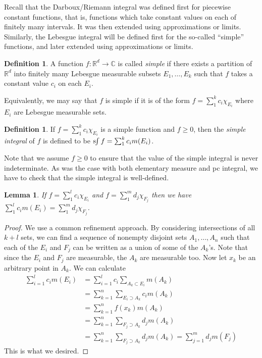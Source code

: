 \documentclass[11pt,oneside]{amsbook}
\newcommand{\RR}{{\mathbb R}}
\newcommand{\CC}{{\mathbb C}}
\newcommand{\sint}{\text{s}\kern-3pt\int}
\theoremstyle{definition}
\theoremstyle{plain}
\newtheorem{lem}[thm]{Lemma}
\theoremstyle{definition}
\newtheorem{defn}[thm]{Definition}
\theoremstyle{remark}
\numberwithin{equation}{section}
\numberwithin{figure}{section}
\begin{document}
Recall that the Darboux/Riemann integral was defined first for piecewise constant functions, that is, functions which take constant values on each of finitely many intervals. It was then extended using approximations or limits. Similarly, the Lebesgue integral will be defined first for the so-called ``simple'' functions, and later extended using approximations or limits.

\begin{defn}
  A function $f\colon\RR^d\to\CC$ is called \emph{simple} if there exists a partition of $\RR^d$ into finitely many Lebesgue measurable subsets $E_1,\ldots,E_k$ such that $f$ takes a constant value $c_i$ on each $E_i$.
\end{defn}

Equivalently, we may say that $f$ is simple if it is of the form $f=\sum_1^kc_i\chi_{E_i}$ where $E_i$ are Lebesgue measurable sets.

\begin{defn}
  If $f=\sum_1^kc_i\chi_{E_i}$ is a simple function and $f\geq0$, then the \emph{simple integral} of $f$ is defined to be $\sint f=\sum_1^kc_im(E_i)$.
\end{defn}

Note that we assume $f\geq0$ to ensure that the value of the simple integral is never indeterminate. As was the case with both elementary measure and pc integral, we have to check that the simple integral is well-defined.

\begin{lem}
  If $f=\sum_1^lc_i\chi_{E_i}$ and $f=\sum_1^md_j\chi_{F_j}$ then we have $\sum_1^lc_im(E_i)=\sum_1^md_j\chi_{F_j}$.
\end{lem}

\begin{proof}
  We use a common refinement approach. By considering intersections of all $k+l$ sets, we can find a sequence of nonempty disjoint sets $A_1,\ldots,A_n$ such that each of the $E_i$ and $F_j$ can be written as a union of some of the $A_k$'s. Note that since the $E_i$ and $F_j$ are measurable, the $A_k$ are measurable too. Now let $x_k$ be an arbitrary point in $A_k$. We can calculate
  \begin{align*}
    \sum_{i=1}^lc_im(E_i)
    &=\sum_{i=1}^lc_i\sum_{A_k\subset E_i}m(A_k)\\
    &=\sum_{k=1}^n\sum_{E_i\supset A_k}c_im(A_k)\\
    &=\sum_{k=1}^nf(x_k)m(A_k)\\
    &=\sum_{k=1}^n\sum_{F_j\supset A_k}d_jm(A_k)\\
    &=\sum_{k=1}^n\sum_{F_j\supset A_k}d_jm(A_k)=\sum_{j=1}^md_jm(F_j)
  \end{align*}
  This is what we desired.
\end{proof}
\end{document}

